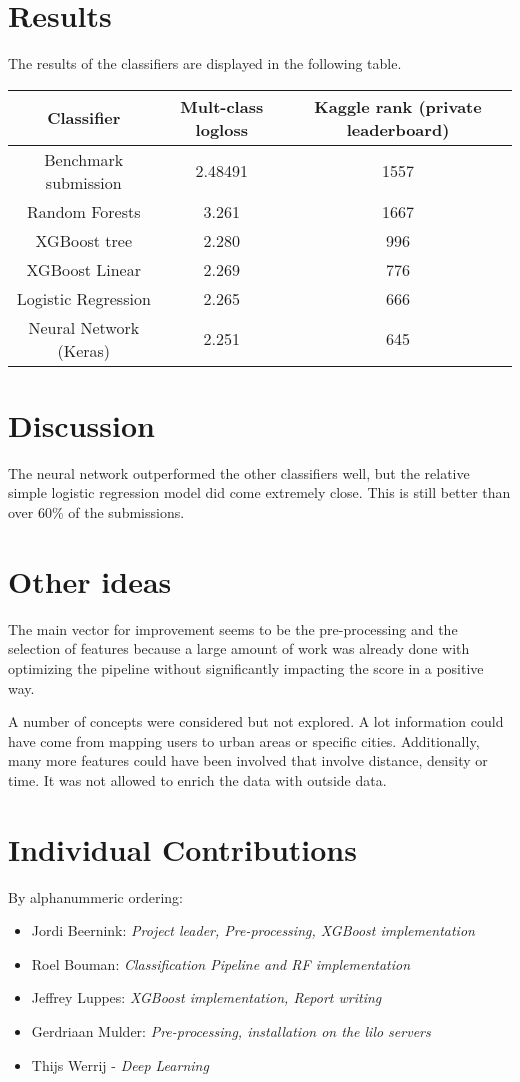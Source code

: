 \documentclass[runningheads,a4paper]{llncs}
\begin{document}
\section{Results}
The results of the classifiers are displayed in the following table. 

\begin{center}
    \begin{tabular}{| c | c | c|}
    \hline 
    Classifier & Mult-class logloss &  Kaggle rank (private leaderboard)\\ \hline
    Benchmark submission & 2.48491 & 1557 \\ \hline
    Random Forests & 3.261 & 1667 \\ \hline
    XGBoost tree & 2.280 & 996 \\ \hline
    XGBoost Linear & 2.269 & 776 \\ \hline
    Logistic Regression & 2.265 & 666 \\ \hline
    Neural Network (Keras) & 2.251 & 645 \\ \hline
    \end{tabular}
\end{center}

\section{Discussion}
The neural network outperformed the other classifiers well, but the relative simple logistic regression model did come extremely close. This is still better than over 60\% of the submissions. 

\section{Other ideas}
The main vector for improvement seems to be the pre-processing and the selection of features because a large amount of work was already done with optimizing the pipeline without significantly impacting the score in a positive way.

A number of concepts were considered but not explored. A lot information could have come from mapping users to urban areas or specific cities. Additionally, many more features could have been involved that involve distance, density or time. It was not allowed to enrich the data with outside data.

\section{Individual Contributions}
By alphanummeric ordering:
\begin{itemize}
\item Jordi Beernink: \textit{Project leader, Pre-processing, XGBoost implementation}
\item Roel Bouman: \textit{Classification Pipeline and RF implementation}
\item Jeffrey Luppes: \textit{XGBoost implementation, Report writing}
\item Gerdriaan Mulder: \textit{Pre-processing, installation on the lilo servers}
\item Thijs Werrij - \textit{Deep Learning}
\end{itemize}
\end{document}
